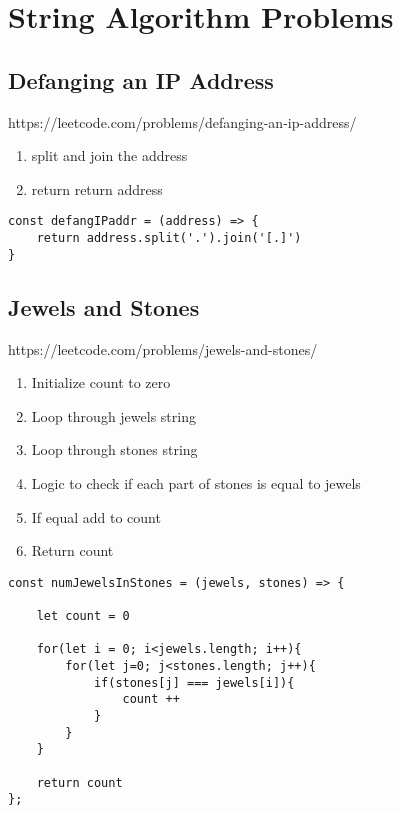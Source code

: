 \documentclass[10pt]{article}
\begin{document}









\pagebreak
\section{String Algorithm Problems}



\medskip %
\subsection{Defanging an IP Address}
https://leetcode.com/problems/defanging-an-ip-address/

\begin{enumerate}
	\item split and join the address
	\item return return address
\end{enumerate}

\begin{lstlisting}[title=Solution defangIPaddr, captionpos=t]
const defangIPaddr = (address) => {
    return address.split('.').join('[.]')
}
\end{lstlisting}
\medskip %



\pagebreak %
\medskip 
\subsection{Jewels and Stones}
https://leetcode.com/problems/jewels-and-stones/

\begin{enumerate}
	\item Initialize count to zero
	\item Loop through jewels string
	\item Loop through stones string
	\item Logic to check if each part of stones is equal to jewels
	\item If equal add to count
	\item Return count
\end{enumerate}

\begin{lstlisting}[title=Solution numJewelsInStones, captionpos=t]
const numJewelsInStones = (jewels, stones) => {
    
    let count = 0
    
    for(let i = 0; i<jewels.length; i++){
        for(let j=0; j<stones.length; j++){
            if(stones[j] === jewels[i]){
                count ++
            }
        }
    }

    return count
};
\end{lstlisting}
\medskip %
\end{document}
